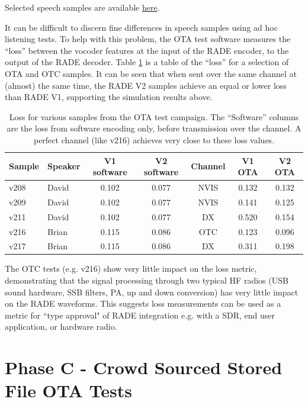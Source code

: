 \documentclass{article}
\begin{document}
Selected speech samples are available \href{https://freedv.org/david-march-2026-ai-v1-c-port-qa-claude-code-v2-eoo-and-snr-stored-file-ota-tests/}{here}.

It can be difficult to discern fine differences in speech samples using ad hoc listening tests. To help with this problem, the OTA test software measures the “loss” between the vocoder features at the input of the RADE encoder, to the output of the RADE decoder.  Table \ref{tab:ota_loss} is a table of the “loss” for a selection of OTA and OTC samples. It can be seen that when sent over the same channel at (almost) the same time, the RADE V2 samples achieve an equal or lower loss than RADE V1, supporting the simulation results above.

\begin{table} [h]
\caption{Loss for various samples from the OTA test campaign. The “Software” columns are the loss from software encoding only, before transmission over the channel. A perfect channel (like v216) achieves very close to these loss values.}
\label{tab:ota_loss}
\centering
\begin{tabular}{ l | l | c | c | c | c | c }
 \hline
 Sample	& Speaker & V1 software & V2 software & Channel & V1 OTA & V2 OTA \\
 \hline
 v208 &	David &	0.102 &	0.077 &	NVIS & 0.132 & 0.132 \\
 v209 &	David &	0.102 &	0.077 &	NVIS & 0.141 & 0.125 \\
 v211 &	David & 0.102 &	0.077 &	DX   & 0.520 & 0.154 \\
 v216 &	Brian &	0.115 &	0.086 &	OTC  & 0.123 & 0.096 \\
 v217 &	Brian &	0.115 &	0.086 &	DX   & 0.311 & 0.198 \\
 \hline
\end{tabular}
\end{table}

The OTC tests (e.g. v216) show very little impact on the loss metric, demonstrating that the signal processing through two typical HF radios (USB sound hardware, SSB filters, PA, up and down conversion) has very little impact on the RADE waveforms. This suggests loss measurements can be used as a metric for ``type approval" of RADE integration e.g. with a SDR, end user application, or hardware radio.

\section{Phase C - Crowd Sourced Stored File OTA Tests}
\end{document}
